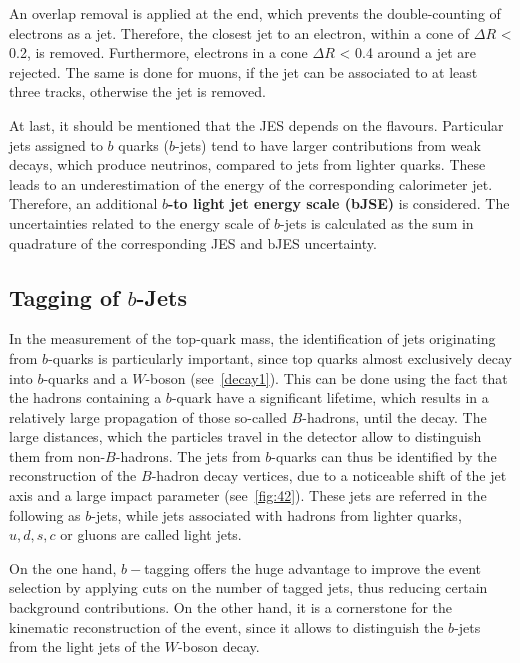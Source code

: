     
 An overlap removal is applied at the end, which prevents the double-counting of electrons as a jet. Therefore, the closest jet to an electron, within a cone of $\Delta R $ < 0.2, is removed. Furthermore, electrons in a cone $\Delta R $ < 0.4 around a jet are rejected. The same is done for muons, if the jet can be associated to at least three tracks, otherwise the jet is removed.
 
 
 At last, it should be mentioned that the JES depends on the flavours. 
 Particular jets assigned to $b$ quarks ($b$-jets) tend to have larger contributions from weak decays, which produce neutrinos, compared to jets from lighter quarks. These leads to an underestimation of the energy of the corresponding calorimeter jet. Therefore, an additional \textbf{$b$-to light jet energy scale (bJSE)} is considered.  The uncertainties related to the energy scale of $b$-jets is calculated as the sum in quadrature of the corresponding JES and bJES uncertainty.   

 



\subsection{Tagging of $b$-Jets}
In the measurement of the top-quark mass, the identification of jets originating from $b$-quarks is particularly important, since  top quarks almost exclusively decay into $b$-quarks and a $W$-boson (see~\cref{decay1}). This can be done using the fact that the hadrons containing a $b$-quark have a significant  lifetime, which results in a relatively large propagation of those so-called $B$-hadrons, until the decay. The  large distances, which the particles travel in the detector allow to distinguish them from non-$B$-hadrons.   
The  jets  from $b$-quarks can thus be identified by the reconstruction of the $B$-hadron decay vertices, due to a noticeable shift of the  jet axis and a large impact parameter (see~\cref{fig:42}). These jets are referred in the following as $b$-jets, while jets associated with hadrons from lighter quarks, $u, d, s, c$ or gluons are called light jets.

On the one hand, $b-$tagging offers the huge advantage to improve the event selection by applying cuts on the number of tagged jets, thus reducing certain background contributions. On the other hand, it is a cornerstone for the kinematic reconstruction of the event, since it allows to distinguish the $b$-jets from the light jets of the $W$-boson decay. 

